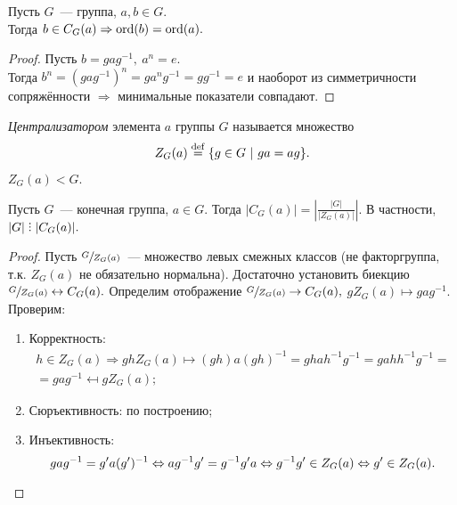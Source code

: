         \begin{lemma}
            Пусть $G$~--- группа, ${a,b \in G.}$ \\
            Тогда ${b \in C_G(a) \Rightarrow \mathrm{ord}(b) = \mathrm{ord}(a).}$
        \end{lemma}
        \begin{proof}
            Пусть ${b = gag^{-1}, \ a^n = e.}$ \\
            Тогда ${b^n = (gag^{-1})^n = ga^ng^{-1} = gg^{-1} = e}$ и наоборот из симметричности сопряжённости $\Rightarrow$ минимальные показатели совпадают.
        \end{proof}
        \begin{definition}
            \textit{Централизатором} элемента $a$ группы $G$ называется множество
            \begin{equation*}
                Z_G(a) \stackrel{\mathrm{def}}{=} \{g \in G \ | \ ga = ag\}.
            \end{equation*}
        \end{definition}
        \begin{remark}
            ${Z_G(a) < G.}$
        \end{remark}
        \newpage
        \begin{statement}
            Пусть $G$~--- конечная группа, ${a \in G.}$ Тогда ${|C_G(a)| = |\frac{|G|}{|Z_G(a)|}|.}$ В частности, ${|G| \divby |C_G(a)|.}$
        \end{statement}
        \begin{proof}
            Пусть $\sfrac{G}{Z_G(a)}$~--- множество левых смежных классов (не факторгруппа, т.к. ${Z_G(a)}$ не обязательно нормальна). Достаточно установить биекцию ${\sfrac{G}{Z_G(a)} \leftrightarrow C_G(a).}$\newline
            Определим отображение ${\sfrac{G}{Z_G(a)} \rightarrow C_G(a),}$ ${gZ_G(a) \mapsto gag^{-1}.}$ Проверим:
            \begin{enumerate}
            \setlength\itemsep{0.1em}
                \item Корректность:
                \begin{equation*}
                    \begin{gathered}
                        h \in Z_G(a) \Rightarrow ghZ_G(a) \mapsto (gh)a(gh)^{-1} = ghah^{-1}g^{-1} = gahh^{-1}g^{-1} = \\
                        = gag^{-1} \mapsfrom gZ_G(a);
                    \end{gathered}
                \end{equation*}
                \item Сюръективность: по построению;
                \item Инъективность:\
                \begin{equation*}
                    gag^{-1} = g'a(g')^{-1} \Leftrightarrow ag^{-1}g' = g^{-1}g'a \Leftrightarrow g^{-1}g' \in Z_G(a) \Leftrightarrow g' \in Z_G(a). \qedhere
                \end{equation*}
            \end{enumerate}
        \end{proof}